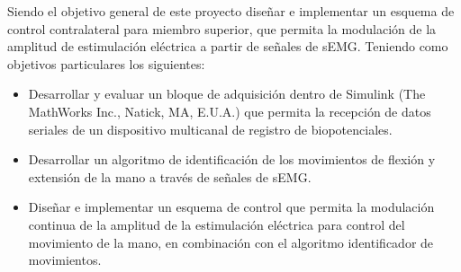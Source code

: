 


Siendo el objetivo general de este proyecto diseñar e implementar un esquema de control contralateral para miembro superior, que permita la modulación de la amplitud de estimulación eléctrica a partir de señales de sEMG. Teniendo como objetivos particulares los siguientes:

\begin{itemize}
	\item Desarrollar y evaluar un bloque de adquisición dentro de Simulink\textregistered \;  (The MathWorks Inc., Natick, MA, E.U.A.) que permita la recepción de datos seriales de un dispositivo multicanal de registro de biopotenciales.
	\item Desarrollar un algoritmo de identificación de los movimientos de flexión y extensión de la mano a través de señales de sEMG.
	\item Diseñar e implementar un esquema de control que permita la modulación continua de la amplitud de la estimulación eléctrica para control del movimiento de la mano, en combinación con el algoritmo identificador de movimientos.
\end{itemize}
